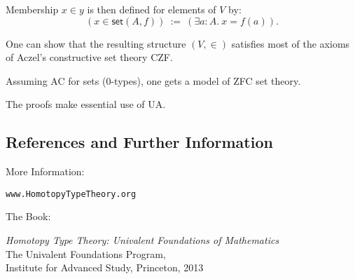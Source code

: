 \documentclass[11pt]{article}
\newcommand{\myemph}[1]{\textbf{#1}}    %
\begin{document}

Membership $x\in y$ is then defined for elements of $V$ by:
\[
  (x \in \mathsf{set}(A,f))\ :=\  (\exists{a : A}.\ x = f(a)).
\]

One can show that the resulting structure $(V,\in)$ satisfies most of the axioms of Aczel's constructive set theory CZF.

Assuming AC for sets ($0$-types), one gets a model of ZFC set theory.

The proofs make essential use of UA.


%
%
%
%
%
%
%
%
\subsection*{References and Further Information}

More Information:
\begin{center}
\tt{www.HomotopyTypeTheory.org}\\
\end{center}
\bigskip


The Book:
\begin{center}
\emph{Homotopy Type Theory: Univalent Foundations of Mathematics}\\
The Univalent Foundations Program,\\
 Institute for Advanced Study, 
 Princeton, 2013
\end{center}

%

\end{document}
